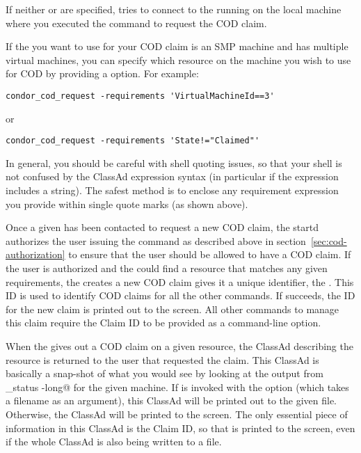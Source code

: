 If neither  or  are specified,
 tries to connect to the  running
on the local machine where you executed the command to request the COD
claim.

If the  you want to use for your COD claim is an SMP
machine and has multiple virtual machines, you can specify which
resource on the machine you wish to use for COD by providing a
 option.  For example:

\begin{verbatim}
condor_cod_request -requirements 'VirtualMachineId==3'
\end{verbatim}
or
\begin{verbatim}
condor_cod_request -requirements 'State!="Claimed"'
\end{verbatim}

In general, you should be careful with shell quoting issues, so that
your shell is not confused by the ClassAd expression syntax (in
particular if the expression includes a string).
The safest method is to enclose any requirement expression you provide
within single quote marks (as shown above).
 
Once a given  has been contacted to request a new COD
claim, the startd authorizes the user issuing the command as described
above in section~\ref{sec:cod-authorization} to ensure that the user
should be allowed to have a COD claim.
If the user is authorized and the  could find a
resource that matches any given requirements, the 
creates a new COD claim gives it a unique identifier, the .
This ID is used to identify COD claims for all the other commands.
If  succeeds, the ID for the new claim is printed
out to the screen.
All other commands to manage this claim require the Claim ID to be
provided as a command-line option.

When the  gives out a COD claim on a given resource,
the ClassAd describing the resource is returned to the user that
requested the claim. 
This ClassAd is basically a snap-shot of what you would see by looking
at the output from \verb@condor_status -long@ for the given machine.
If  is invoked with the  option
(which takes a filename as an argument), this ClassAd will be printed
out to the given file.
Otherwise, the ClassAd will be printed to the screen.
The only essential piece of information in this ClassAd is the Claim
ID, so that is printed to the screen, even if the whole ClassAd is
also being written to a file.

